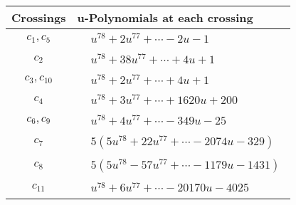 \documentclass[1p]{elsarticle_modified}
\theoremstyle{definition}
\begin{document}
\begin{tabular}{m{50pt}|m{274pt}}
Crossings & \hspace{64pt}u-Polynomials at each crossing \\
\hline $$\begin{aligned}c_{1},c_{5}\end{aligned}$$&$\begin{aligned}
&u^{78}+2 u^{77}+\cdots-2 u-1
\end{aligned}$\\
\hline $$\begin{aligned}c_{2}\end{aligned}$$&$\begin{aligned}
&u^{78}+38 u^{77}+\cdots+4 u+1
\end{aligned}$\\
\hline $$\begin{aligned}c_{3},c_{10}\end{aligned}$$&$\begin{aligned}
&u^{78}+2 u^{77}+\cdots+4 u+1
\end{aligned}$\\
\hline $$\begin{aligned}c_{4}\end{aligned}$$&$\begin{aligned}
&u^{78}+3 u^{77}+\cdots+1620 u+200
\end{aligned}$\\
\hline $$\begin{aligned}c_{6},c_{9}\end{aligned}$$&$\begin{aligned}
&u^{78}+4 u^{77}+\cdots-349 u-25
\end{aligned}$\\
\hline $$\begin{aligned}c_{7}\end{aligned}$$&$\begin{aligned}
&5(5 u^{78}+22 u^{77}+\cdots-2074 u-329)
\end{aligned}$\\
\hline $$\begin{aligned}c_{8}\end{aligned}$$&$\begin{aligned}
&5(5 u^{78}-57 u^{77}+\cdots-1179 u-1431)
\end{aligned}$\\
\hline $$\begin{aligned}c_{11}\end{aligned}$$&$\begin{aligned}
&u^{78}+6 u^{77}+\cdots-20170 u-4025
\end{aligned}$\\
\hline
\end{tabular}\\~\\
\end{document}
